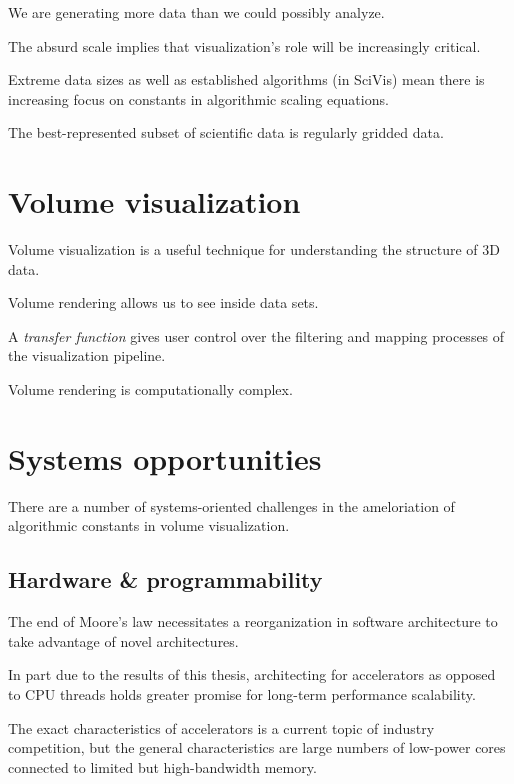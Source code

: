 We are generating more data than we could possibly analyze.


The absurd scale implies that visualization's role will be increasingly
critical.


Extreme data sizes as well as established algorithms (in SciVis)
mean there is increasing focus on constants in algorithmic scaling
equations.

The best-represented subset of scientific data is regularly gridded
data.

%
%

\section{Volume visualization}


Volume visualization is a useful technique for understanding the
structure of 3D data.

Volume rendering allows us to see inside data sets.


A \emph{transfer function} gives user control over the filtering and
mapping processes of the visualization pipeline.


Volume rendering is computationally complex.

\section{Systems opportunities}

There are a number of systems-oriented challenges in the ameloriation of
algorithmic constants in volume visualization.

\subsection{Hardware \& programmability}

The end of Moore's law necessitates a reorganization in software architecture
to take advantage of novel architectures.

In part due to the results of this thesis, architecting for
accelerators as opposed to CPU threads holds greater promise for
long-term performance scalability.

The exact characteristics of accelerators is a current topic of
industry competition, but the general characteristics are large numbers
of low-power cores connected to limited but high-bandwidth memory.

